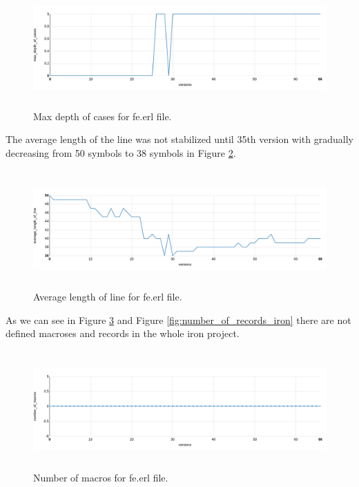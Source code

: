 \begin{figure}[ht]
	\centering
	\includegraphics[height=45mm]{figures/max_depth_of_cases_iron.png}
	\caption{Max depth of cases for fe.erl file.}
	\label{fig:max_depth_of_cases_iron}
\end{figure}

The average length of the line was not stabilized until 35th version with gradually decreasing from 50 symbols to 38 symbols in Figure \ref{fig:average_length_of_line_iron}.

\begin{figure}[ht]
	\centering
	\includegraphics[height=45mm]{figures/average_length_of_line_iron.png}
	\caption{Average length of line for fe.erl file.}
	\label{fig:average_length_of_line_iron}
\end{figure}

As we can see in Figure \ref{fig:number_of_macros_iron} and Figure \ref{fig:number_of_records_iron} there are not defined macroses and records in the whole iron project.

\begin{figure}[ht]
	\centering
	\includegraphics[height=45mm]{figures/number_of_macros_iron.png}
	\caption{Number of macros for fe.erl file.}
	\label{fig:number_of_macros_iron}
\end{figure}

